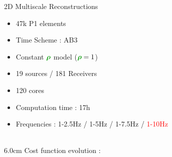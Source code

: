 \begin{frame}[noframenumbering]{2D Multiscale Reconstructions}

  \begin{multicols}{2}
    \begin{itemize}
    \item 47k P1 elements
    \item Time Scheme : AB3
    \item Constant $\density$ model ($\density=1$)
    \item 19 sources / 181 Receivers
    \item 120 cores
    \item Computation time : 17h
    \item Frequencies : 1-2.5Hz / 1-5Hz / 1-7.5Hz / \textcolor{red}{1-10Hz} \\ ~
    \end{itemize}
    \columnbreak

    \setlength{\plotwidth} {6.0cm}
    \setlength{\plotheight}{5cm}
    Cost function evolution :
    \begin{figure}
    \end{figure}
  \end{multicols}
\end{frame}

